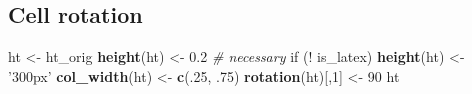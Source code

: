 \documentclass[]{article}
\newenvironment{Shaded}{\begin{snugshade}}{\end{snugshade}}
\newcommand{\KeywordTok}[1]{\textcolor[rgb]{0.13,0.29,0.53}{\textbf{{#1}}}}
\newcommand{\DecValTok}[1]{\textcolor[rgb]{0.00,0.00,0.81}{{#1}}}
\newcommand{\FloatTok}[1]{\textcolor[rgb]{0.00,0.00,0.81}{{#1}}}
\newcommand{\StringTok}[1]{\textcolor[rgb]{0.31,0.60,0.02}{{#1}}}
\newcommand{\CommentTok}[1]{\textcolor[rgb]{0.56,0.35,0.01}{\textit{{#1}}}}
\newcommand{\NormalTok}[1]{{#1}}
\begin{document}
\FloatBarrier

\subsection{Cell rotation}\label{cell-rotation}

\begin{Shaded}
\begin{Highlighting}[]
\NormalTok{ht <-}\StringTok{ }\NormalTok{ht_orig}
\KeywordTok{height}\NormalTok{(ht) <-}\StringTok{ }\FloatTok{0.2} \CommentTok{# necessary}
\NormalTok{if (!}\StringTok{ }\NormalTok{is_latex) }\KeywordTok{height}\NormalTok{(ht) <-}\StringTok{ '300px'}
\KeywordTok{col_width}\NormalTok{(ht) <-}\StringTok{ }\KeywordTok{c}\NormalTok{(.}\DecValTok{25}\NormalTok{, .}\DecValTok{75}\NormalTok{)}
\KeywordTok{rotation}\NormalTok{(ht)[,}\DecValTok{1}\NormalTok{] <-}\StringTok{ }\DecValTok{90}
\NormalTok{ht}
\end{Highlighting}
\end{Shaded}
\end{document}
